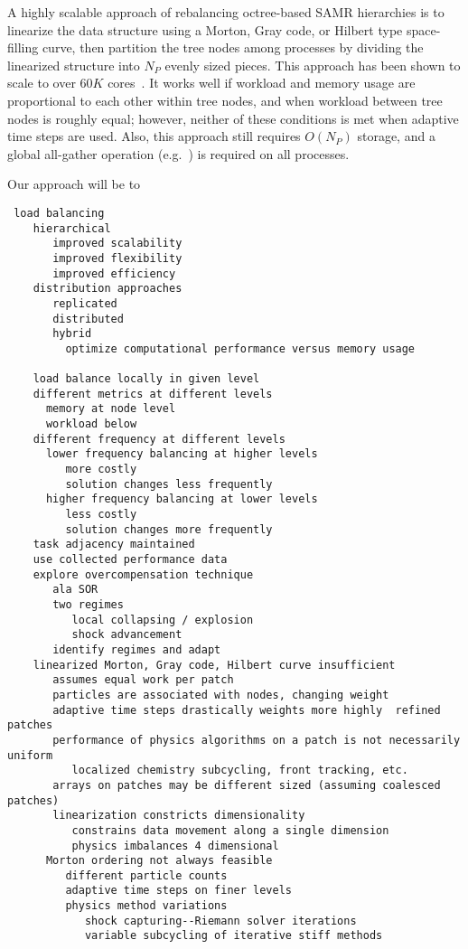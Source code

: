 \documentclass[10pt]{article}
\begin{document}
A highly scalable approach of rebalancing octree-based SAMR
hierarchies is to linearize the data structure using a Morton, Gray
code, or Hilbert type space-filling curve, then partition the tree
nodes among processes by dividing the linearized structure into $N_P$
evenly sized pieces.  This approach has been shown to scale to over
$60K$ cores~\cite{@@@ART}.  It works well if workload and memory usage
are proportional to each other within tree nodes, and when workload
between tree nodes is roughly equal; however, neither of these
conditions is met when adaptive time steps are used.  Also, this
approach still requires $O(N_P)$ storage, and a global all-gather
operation (e.g.~) is required on all processes.

Our approach will be to 

\begin{verbatim}
 load balancing
    hierarchical
       improved scalability
       improved flexibility
       improved efficiency
    distribution approaches
       replicated
       distributed
       hybrid
         optimize computational performance versus memory usage
     
    load balance locally in given level
    different metrics at different levels
      memory at node level
      workload below
    different frequency at different levels
      lower frequency balancing at higher levels
         more costly
         solution changes less frequently
      higher frequency balancing at lower levels
         less costly
         solution changes more frequently
    task adjacency maintained
    use collected performance data
    explore overcompensation technique
       ala SOR
       two regimes
          local collapsing / explosion
          shock advancement
       identify regimes and adapt
    linearized Morton, Gray code, Hilbert curve insufficient
       assumes equal work per patch
       particles are associated with nodes, changing weight
       adaptive time steps drastically weights more highly  refined patches
       performance of physics algorithms on a patch is not necessarily uniform
          localized chemistry subcycling, front tracking, etc.
       arrays on patches may be different sized (assuming coalesced patches)
       linearization constricts dimensionality
          constrains data movement along a single dimension
          physics imbalances 4 dimensional
      Morton ordering not always feasible
         different particle counts
         adaptive time steps on finer levels
         physics method variations
            shock capturing--Riemann solver iterations
            variable subcycling of iterative stiff methods
\end{verbatim}
\end{document}
